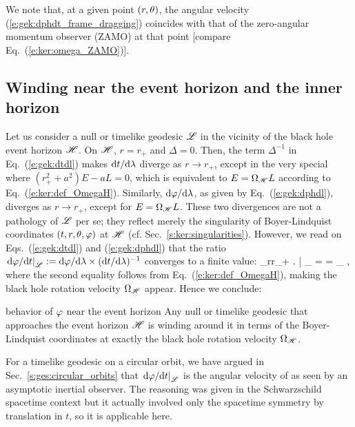 We note that, at a given point $(r,\theta)$, the angular velocity (\ref{e:gek:dphdt_frame_dragging})
coincides with that of the zero-angular momentum observer (ZAMO) at that point
[compare Eq.~(\ref{e:ker:omega_ZAMO})].

\subsection{Winding near the event horizon and the inner horizon}

Let us consider a null or timelike geodesic $\mathscr{L}$ in the vicinity of the
black hole event horizon $\mathscr{H}$.
On $\mathscr{H}$, $r=r_+$ and $\Delta = 0$. Then, the term
$\Delta^{-1}$ in Eq.~(\ref{e:gek:dtdl}) makes $\mathrm{d} t/\mathrm{d}\lambda$ diverge as
$r\to r_+$, except in the very special where $(r_+^2 + a^2)E - aL = 0$, which
is equivalent to $E = \Omega_{\mathscr{H}} L$ according to Eq.~(\ref{e:ker:def_OmegaH}).
Similarly, $\mathrm{d}\varphi/\mathrm{d}\lambda$, as given by Eq.~(\ref{e:gek:dphdl}), diverges
as $r\to r_+$, except for $E = \Omega_{\mathscr{H}} L$. These two divergences are not
a pathology of $\mathscr{L}$ per se; they
reflect merely the singularity of Boyer-Lindquist coordinates $(t,r,\theta,\varphi)$ at $\mathscr{H}$
(cf.  Sec.~\ref{s:ker:singularities}). However, we read on Eqs.~(\ref{e:gek:dtdl}) and
(\ref{e:gek:dphdl}) that the ratio
$\left. \mathrm{d}\varphi/\mathrm{d} t \right| _{\mathscr{L}} := \mathrm{d}\varphi/\mathrm{d}\lambda \times (\mathrm{d} t/\mathrm{d}\lambda)^{-1}$
converges to a finite value:
\be \label{e:gek:lim_dphdt_Hor}
    \lim_{r\to r_+} \left.  \right| _{\Li} =  = \Omega_{\Hor} ,
\ee
where the second equality follows from Eq.~(\ref{e:ker:def_OmegaH}), making
the black hole rotation velocity $\Omega_{\mathscr{H}}$ appear.
Hence we conclude:
\begin{tprop}{behavior of $\varphi$ near the event horizon}{}
Any null or timelike geodesic that approaches the event horizon $\mathscr{H}$
is winding around it in terms of the Boyer-Lindquist coordinates at exactly the black hole rotation velocity $\Omega_{\mathscr{H}}$.
\end{tprop}

\begin{remark}
For a timelike geodesic on a circular orbit, we have argued in Sec.~\ref{s:ges:circular_orbits}
that $\left. \mathrm{d}\varphi/\mathrm{d} t \right| _{\mathscr{L}}$ is the angular velocity of
as seen by an asymptotic inertial observer. The reasoning was
given in the Schwarzschild spacetime context but it actually involved only
the spacetime symmetry by translation in $t$, so it is applicable here.
\end{remark}

